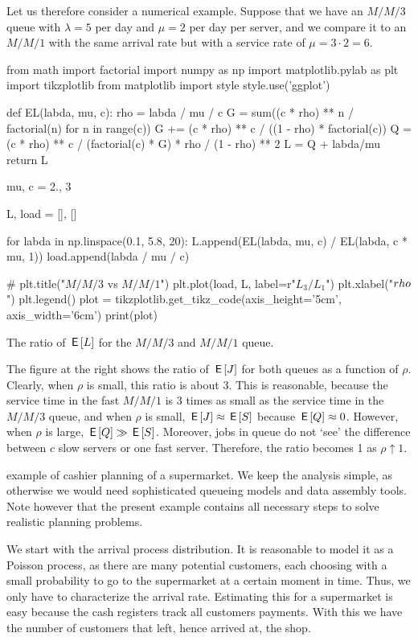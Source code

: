 Let us therefore consider a numerical example.
Suppose that we have an $M/M/3$ queue with $\lambda = 5$ per day and $\mu=2$ per day per server, and we compare it to an $M/M/1$ with the same arrival rate but with a service rate of $\mu = 3\cdot 2 = 6$.
\begin{marginfigure}
\begin{pycode}[ratio]
from math import factorial
import numpy as np
import matplotlib.pylab as plt
import tikzplotlib
from matplotlib import style
style.use('ggplot')


def EL(labda, mu, c):
    rho = labda / mu / c
    G = sum((c * rho) ** n / factorial(n) for n in range(c))
    G += (c * rho) ** c / ((1 - rho) * factorial(c))
    Q = (c * rho) ** c / (factorial(c) * G) * rho / (1 - rho) ** 2
    L = Q + labda/mu
    return L


mu, c = 2., 3

L, load = [], []

for labda in np.linspace(0.1, 5.8, 20):
    L.append(EL(labda, mu, c) / EL(labda, c * mu, 1))
    load.append(labda / mu / c)

# plt.title("$M/M/3$ vs $M/M/1$")
plt.plot(load, L, label=r"$L_3/L_1$")
plt.xlabel("$\\rho$")
plt.legend()
plot = tikzplotlib.get_tikz_code(axis_height='5cm',
                                 axis_width='6cm')
print(plot)
\end{pycode}
\caption{The ratio of $\,\mathsf{E}\left[L\right]$ for the $M/M/3$ and $M/M/1$ queue.}
\label{fig:fast}
\end{marginfigure}

The figure at the right shows the ratio of $\,\mathsf{E}\left[J\right]$ for both queues as a function of $\rho$.
Clearly, when $\rho$ is small, this ratio is about $3$.
This is reasonable, because the service time in the fast $M/M/1$ is 3 times as small as the service time in the $M/M/3$ queue, and when $\rho$ is small, $\,\mathsf{E}\left[J\right] \approx \,\mathsf{E}\left[S\right]$ because $\,\mathsf{E}\left[Q\right] \approx 0$.
However, when $\rho$ is large, $\,\mathsf{E}\left[Q\right] \gg \,\mathsf{E}\left[S\right]$.
Moreover, jobs in queue do not `see' the difference between $c$ slow servers or one fast server. Therefore, the ratio becomes 1 as $\rho\uparrow 1$. 


 example of cashier planning of a supermarket.
We keep the analysis simple, as otherwise we would need sophisticated queueing models and data assembly tools.
Note however that the present example contains all  necessary steps to solve realistic planning problems.


We start with the arrival process distribution.
It is reasonable to model it as a Poisson process, as there are many potential customers, each choosing with a small probability to go to the supermarket at a certain moment in time.
Thus, we only have to characterize the arrival rate.
Estimating this for a supermarket is easy because the cash registers track all customers payments.
With this we have the number of customers that left, hence arrived at, the shop.

